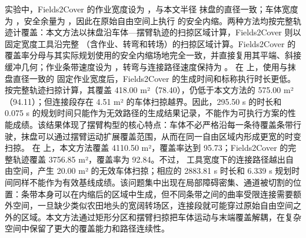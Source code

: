 {}实验中，Fields2Cover 的作业宽度设为 ，与本文半径  抹盘的直径一致；车体宽度为 ，安全余量为 ，因此在原始自由空间上执行  的安全内缩。两种方法均按完整轨迹计覆盖：本文方法以抹盘沿车体—摆臂轨迹的扫掠区域计算，Fields2Cover 则以固定宽度工具沿完整 （含作业、转弯和转场）的扫掠区域计算。Fields2Cover 的覆盖率分母与其实际规划使用的安全内缩场地完全一致，并直接复用其平端、斜接缓冲几何；作业条带速度设为 ，转弯与连接路径速度保持为 。\markdownRendererParagraphSeparator
{}\markdownRendererParagraphSeparator
{}在  上，使用与抹盘直径一致的  固定作业宽度后，Fields2Cover 的生成时间和标称执行时长更低。按完整轨迹扫掠计算，其覆盖 418.00 m²（78.40\markdownRendererPercentSign{}），仍低于本文方法的 575.00 m²（94.11\markdownRendererPercentSign{}）；但连接段存在 4.51 m² 的车体扫掠越界。因此，295.50 s 的时长和 0.075 s 的规划时间只能作为无效路径的生成结果记录，不能作为可执行方案的性能成绩。该结果体现了摆臂构型的核心特点：车体不必严格沿每一条待覆盖条带行驶，抹盘可以通过摆臂运动扩展覆盖范围，从而在同一自由区域内形成更宽的时变扫掠。\markdownRendererParagraphSeparator
{}在  上，本文方法覆盖 4110.50 m²，覆盖率达到 95.73\markdownRendererPercentSign{}；Fields2Cover 的完整轨迹覆盖 3756.85 m²，覆盖率为 92.84\markdownRendererPercentSign{}。不过， 工具宽度下的连接路径越出自由空间，产生 20.00 m² 的无效车体扫掠；相应的 2883.81 s 时长和 6.339 s 规划时间同样不能作为有效基线成绩。该问题集中出现在局部障碍密集、通道被切割的位置：条带本身可以在内缩后的区域中生成，但不同条带之间的曲率受限连接需要额外空间，一旦缺少类似农田地头的宽阔转场区，连接段就可能穿过原始自由空间之外的区域。本文方法通过矩形分区和摆臂扫掠把车体运动与末端覆盖解耦，在复杂空间中保留了更大的覆盖能力和路径连续性。\markdownRendererParagraphSeparator
{}\markdownRendererParagraphSeparator
